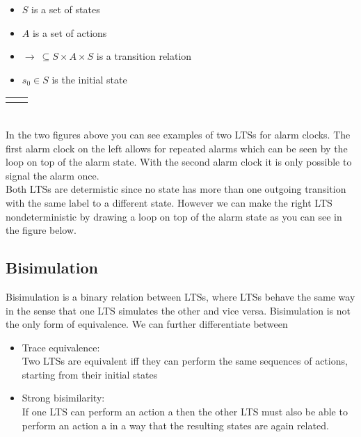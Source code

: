 \documentclass{clseminar}
\begin{document}
  \begin{itemize}[noitemsep]
    \item $S$ is a set of states \\
    \item $A$ is a set of actions \\
    \item $\to\ \subseteq S \times A \times S$ is a transition relation \\
    \item $s_0 \in S$ is the initial state \\
  \end{itemize}

  \begin{tabular}{cc}
    \begin{minipage}{.5\linewidth}
      \centering
      
    \end{minipage}
    \begin{minipage}{.5\linewidth}
      \centering
      
    \end{minipage}
  \end{tabular} \\[12pt]

  In the two figures above you can see examples of two LTSs for alarm clocks. The first alarm clock on the left allows for repeated alarms which can be seen by the loop on top of the alarm state. With the second alarm clock it is only possible to signal the alarm once. \\
  Both LTSs are determistic since no state has more than one outgoing transition with the same label to a different state. However we can make the right LTS nondeterministic by drawing a loop on top of the alarm state as you can see in the figure below. \\

  \begin{center}
    
  \end{center}

  \subsection{Bisimulation}
  Bisimulation is a binary relation between LTSs, where LTSs behave the same way in the sense
  that one LTS simulates the other and vice versa. Bisimulation is not the only form of equivalence. We can further differentiate between

  \begin{itemize}[noitemsep]
    \item Trace equivalence: \\
    Two LTSs are equivalent iff they can perform the same sequences of actions, starting from their initial states \\
    \item Strong bisimilarity: \\
    If one LTS can perform an action a then the other LTS must also be able to perform an action a in a way that the resulting states are again related. \\
  \end{itemize}
\end{document}
